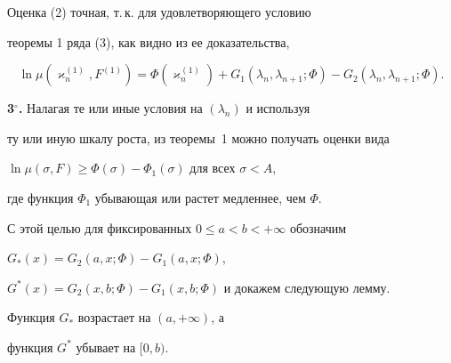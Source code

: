 \begin{note} Оценка (2) точная, т.\,к. для удовлетворяющего условию


теоремы 1 ряда (3), как видно из ее доказательства, 


$$


\ln\mu(\varkappa^{(1)}_n,F^{(1)})=


\Phi(\varkappa^{(1)}_n)+G_1(\lambda_n,\lambda_{n+1};\Phi)-


G_2(\lambda_n,\lambda_{n+1};\Phi).    


$$


\end{note}





{\bf 3${}^\circ$.} Налагая те или иные условия на $(\lambda_n)$ и используя


ту или иную шкалу роста, из теоремы~1 можно получать оценки вида


$\ln\mu(\sigma,F)\ge\Phi(\sigma)-\Phi_1(\sigma)$ для всех $\sigma<A$,


где функция $\Phi_1$ убывающая или растет медленнее, чем $\Phi$.


С этой целью для фиксированных $0\le a<b<+\infty$ обозначим 


$G_*(x)=G_2(a,x;\Phi)-G_1(a,x;\Phi)$,


$G^*(x)=G_2(x,b;\Phi)-G_1(x,b;\Phi)$ и докажем следующую лемму.





\begin{lemnonum} Функция $G_*$ возрастает на $(a,+\infty)$, а


функция $G^*$ убывает на $[0,b)$.


\end{lemnonum}





